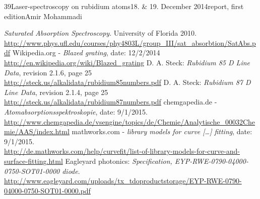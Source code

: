 \documentclass[a4paper, parskip=half, 12pt, bibliography=totocnumbered]{scrartcl}
\begin{document}
{39}{Laser-spectroscopy on rubidium atoms}{18. \& 19. December 2014}{report, first edition}{Amir Mohammadi}{}





\begin{thebibliography}{10}
 \emph{Saturated Absorption Spectroscopy}. University of Florida 2010.\\
\url{http://www.phys.ufl.edu/courses/phy4803L/group_III/sat_absorbtion/SatAbs.pdf}
 Wikipedia.org - \emph{Blazed grating}, date: 12/2/2014\\
\url{http://en.wikipedia.org/wiki/Blazed_grating}
 D. A. Steck: \emph{Rubidium 85 D Line Data}, revision 2.1.6, page 25\\
\url{http://steck.us/alkalidata/rubidium85numbers.pdf}
 D. A. Steck: \emph{Rubidium 87 D Line Data}, revision 2.1.4, page 25\\
\url{http://steck.us/alkalidata/rubidium87numbers.pdf}
 chemgapedia.de - \emph{Atomabsorptionsspektroskopie}, date: 9/1/2015.\\
\url{http://www.chemgapedia.de/vsengine/topics/de/Chemie/Analytische_00032Chemie/AAS/index.html}
 mathworks.com - \emph{library models for curve [\dots] fitting}, date: 9/1/2015.\\
\url{http://de.mathworks.com/help/curvefit/list-of-library-models-for-curve-and-surface-fitting.html}
 Eagleyard photonics: \emph{Specification, EYP-RWE-0790-04000-0750-SOT01-0000 diode}.\\
\url{http://www.eagleyard.com/uploads/tx_tdoproductstorage/EYP-RWE-0790-04000-0750-SOT01-0000.pdf}
\end{thebibliography}
\end{document}
